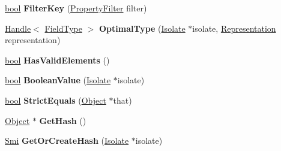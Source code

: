 \begin{DoxyCompactItemize}
\item 
\mbox{\label{classv8_1_1internal_1_1Object_af84c961ca1149c39037e1799ac6e48d6}} 
\mbox{\hyperlink{classbool}{bool}} {\bfseries Filter\+Key} (\mbox{\hyperlink{namespacev8_afbf02b6b1152a3e25d7bde90798209ac}{Property\+Filter}} filter)
\item 
\mbox{\label{classv8_1_1internal_1_1Object_aaf5c9660b3ae67a56224842066768509}} 
\mbox{\hyperlink{classv8_1_1internal_1_1Handle}{Handle}}$<$ \mbox{\hyperlink{classv8_1_1internal_1_1FieldType}{Field\+Type}} $>$ {\bfseries Optimal\+Type} (\mbox{\hyperlink{classv8_1_1internal_1_1Isolate}{Isolate}} $\ast$isolate, \mbox{\hyperlink{classv8_1_1internal_1_1Representation}{Representation}} representation)
\item 
\mbox{\label{classv8_1_1internal_1_1Object_a5a4ebd23df8bed6bf2710bc2c8a12958}} 
\mbox{\hyperlink{classbool}{bool}} {\bfseries Has\+Valid\+Elements} ()
\item 
\mbox{\label{classv8_1_1internal_1_1Object_aa764a4f841f8c9bc4a0eb81cbf86774d}} 
\mbox{\hyperlink{classbool}{bool}} {\bfseries Boolean\+Value} (\mbox{\hyperlink{classv8_1_1internal_1_1Isolate}{Isolate}} $\ast$isolate)
\item 
\mbox{\label{classv8_1_1internal_1_1Object_adc298613478898dacee931f9d2be77d8}} 
\mbox{\hyperlink{classbool}{bool}} {\bfseries Strict\+Equals} (\mbox{\hyperlink{classv8_1_1internal_1_1Object}{Object}} $\ast$that)
\item 
\mbox{\label{classv8_1_1internal_1_1Object_a1705a523fa7ddd6974100c014767b718}} 
\mbox{\hyperlink{classv8_1_1internal_1_1Object}{Object}} $\ast$ {\bfseries Get\+Hash} ()
\item 
\mbox{\label{classv8_1_1internal_1_1Object_a4c7bfce3f19c7a36bcdd4b0336cdd49f}} 
\mbox{\hyperlink{classv8_1_1internal_1_1Smi}{Smi}} {\bfseries Get\+Or\+Create\+Hash} (\mbox{\hyperlink{classv8_1_1internal_1_1Isolate}{Isolate}} $\ast$isolate)
\item 
\mbox{\label{classv8_1_1internal_1_1Object_a4218e7b873b8150ee86e5a5d2572add7}} 

\end{DoxyCompactItemize}
